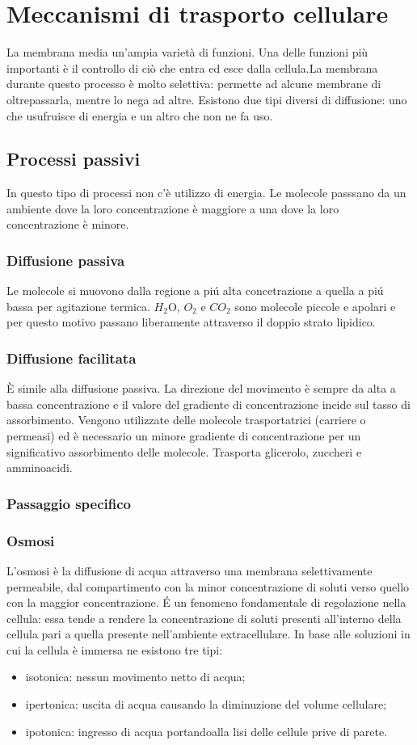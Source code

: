 \chapter{Meccanismi di trasporto cellulare}
La membrana media un'ampia varietà di funzioni. Una delle funzioni pi\`u importanti \`e il controllo di ci\`o  che entra ed esce dalla cellula.La membrana durante questo processo è molto selettiva: permette ad alcune membrane di oltrepassarla, mentre lo nega ad altre. Esistono due tipi diversi di diffusione: uno che usufruisce di energia e un altro che non ne fa uso.
\section{Processi passivi}
In questo tipo di processi non c'\`e utilizzo di energia. Le molecole passsano da un ambiente dove la loro concentrazione \`e maggiore a una dove la loro concentrazione \`e minore.
\subsection{Diffusione passiva}
Le molecole si muovono dalla regione a pi\'u alta concetrazione a quella a pi\'u bassa per agitazione termica. $H_2$O, $O_2$ e $CO_2$ sono molecole piccole e apolari e per questo motivo passano liberamente attraverso il doppio strato lipidico. 
\subsection{Diffusione facilitata}
\`E simile alla diffusione passiva. La direzione del movimento \`e sempre da alta a bassa concentrazione e il valore del gradiente di concentrazione incide sul tasso di assorbimento. Vengono utilizzate delle molecole trasportatrici (carriere o permeasi) ed \`e necessario un minore gradiente di concentrazione per un significativo assorbimento delle molecole. Trasporta glicerolo, zuccheri e amminoacidi.
\subsection{Passaggio specifico}
\subsection{Osmosi}
L'osmosi \`e la diffusione di acqua attraverso una membrana selettivamente permeabile, dal compartimento con la minor concentrazione di soluti verso quello con la maggior concentrazione. \'E un fenomeno fondamentale di regolazione nella cellula: essa tende a rendere la concentrazione di soluti presenti all'interno della cellula pari a quella presente nell'ambiente extracellulare. In base alle soluzioni in cui la cellula \`e immersa ne esistono tre tipi:
\begin{itemize}
    \item isotonica: nessun movimento netto di acqua;
    \item ipertonica: uscita di acqua causando la diminuzione del volume cellulare;
    \item ipotonica: ingresso di acqua portandoalla lisi delle cellule prive di parete.
\end{itemize}
